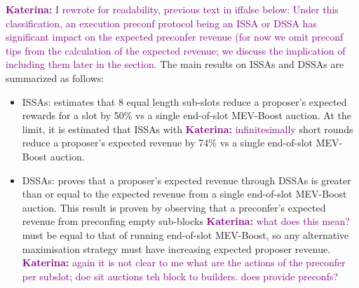 \documentclass[a4paper]{article}
\theoremstyle{boldstyle}
\newcommand{\ks}[1]{\textcolor{purple}{\textbf{Katerina:} #1}}
\begin{document}
   \ks{I rewrote for readability, previous text in iffalse below: Under this classification, an execution preconf protocol being an ISSA or DSSA has 
    significant impact on the expected preconfer revenue (for now we omit preconf tips from the calculation of the expected revenue; we discuss the implication of including them later in the section. } The main results on ISSAs and DSSAs are summarized as follows:
    

    \begin{itemize}
        \item ISSAs: \cite{W:EstimatingtheRevenuefromIndependentSub-SlotAuctionPreconfirmations} estimates that 8 equal length sub-slots reduce a proposer's expected rewards for a slot by 50\% vs a single end-of-slot MEV-Boost auction. At the limit, it is estimated that ISSAs with \ks{infinitesimally} short rounds reduce a proposer's expected revenue by 74\%  vs a single end-of-slot MEV-Boost auction.

        \item DSSAs: \cite{W:AnalysingExpectedProposerRevenuefromPreconfirmations} proves that a proposer's expected revenue through DSSAs is greater than or equal to the expected revenue from a single end-of-slot MEV-Boost auction. This result is proven by observing that a preconfer's expected revenue from preconfing empty sub-blocks \ks{what does this mean?} must be equal to that of running end-of-slot MEV-Boost, so any alternative maximisation strategy must have increasing expected proposer revenue. \ks{again it is not clear to me what are the actions of the preconfer per subslot; doe sit auctions teh block to builders. does provide preconfs?} 
    \end{itemize}
\end{document}
